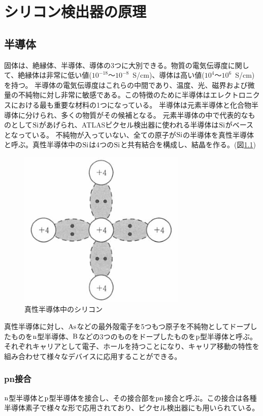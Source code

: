 
\chapter{シリコン検出器の原理}
\section{半導体\cite{2-1}}
固体は、絶縁体、半導体、導体の3つに大別できる。物質の電気伝導度に関して、絶縁体は非常に低い値($10^{-18}〜10^{-8}$~S/cm)、導体は高い値($10^{4}〜10^{6}$~S/cm)を持つ。
半導体の電気伝導度はこれらの中間であり、温度、光、磁界および微量の不純物に対し非常に敏感である。この特徴のために半導体はエレクトロニクスにおける最も重要な材料の1つになっている。
半導体は元素半導体と化合物半導体に分けられ、多くの物質がその候補となる。
元素半導体の中で代表的なものとして$\rm{Si}$があげられ、ATLASピクセル検出器に使われる半導体は$\rm{Si}$がベースとなっている。
不純物が入っていない、全ての原子が$\rm{Si}$の半導体を真性半導体と呼ぶ。真性半導体中の$\rm{Si}$は4つの$\rm{Si}$と共有結合を構成し、結晶を作る。(図\ref{pure_silicon})

\begin{figure}[bpt]\centering
\includegraphics[width=8cm]{pure_silicon}
\caption[真性半導体中のシリコン]{真性半導体中のシリコン\cite{2-1}}
\label{pure_silicon}
\end{figure}

真性半導体に対し、$\rm{As}$などの最外殻電子を5つもつ原子を不純物としてドープしたものを$\rm{n}$型半導体、$\rm{B}$などの3つのものをドープしたものを$\rm{p}$型半導体と呼ぶ。
それぞれキャリアとして電子、ホールを持つことになり、キャリア移動の特性を組み合わせて様々なデバイスに応用することができる。

\subsection{pn接合}
$\rm{n}$型半導体と$\rm{p}$型半導体を接合し、その接合部を$\rm{pn}$接合と呼ぶ。この接合は各種半導体素子で様々な形で応用されており、ピクセル検出器にも用いられている。

